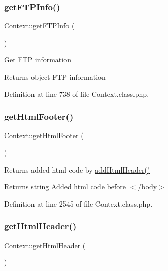 \hypertarget{classContext_a4f3473f93028ce5f422135106f125f31}{}\label{classContext_a4f3473f93028ce5f422135106f125f31} 
\subsubsection{\texorpdfstring{get\+F\+T\+P\+Info()}{getFTPInfo()}}
{\footnotesize\ttfamily Context\+::get\+F\+T\+P\+Info (\begin{DoxyParamCaption}{ }\end{DoxyParamCaption})}

Get F\+TP information

\begin{DoxyReturn}{Returns}
object F\+TP information 
\end{DoxyReturn}


Definition at line 738 of file Context.\+class.\+php.

\hypertarget{classContext_ae7bb6879f84366eea76da3a7bf6a40bd}{}\label{classContext_ae7bb6879f84366eea76da3a7bf6a40bd} 
\subsubsection{\texorpdfstring{get\+Html\+Footer()}{getHtmlFooter()}}
{\footnotesize\ttfamily Context\+::get\+Html\+Footer (\begin{DoxyParamCaption}{ }\end{DoxyParamCaption})}

Returns added html code by \hyperlink{classContext_a26a1aea944ae54bb826500f544a67950}{add\+Html\+Header()}

\begin{DoxyReturn}{Returns}
string Added html code before $<$/body$>$ 
\end{DoxyReturn}


Definition at line 2545 of file Context.\+class.\+php.

\hypertarget{classContext_a302e4b5d868e7a5c8bee216f774ca244}{}\label{classContext_a302e4b5d868e7a5c8bee216f774ca244} 
\subsubsection{\texorpdfstring{get\+Html\+Header()}{getHtmlHeader()}}
{\footnotesize\ttfamily Context\+::get\+Html\+Header (\begin{DoxyParamCaption}{ }\end{DoxyParamCaption})}

